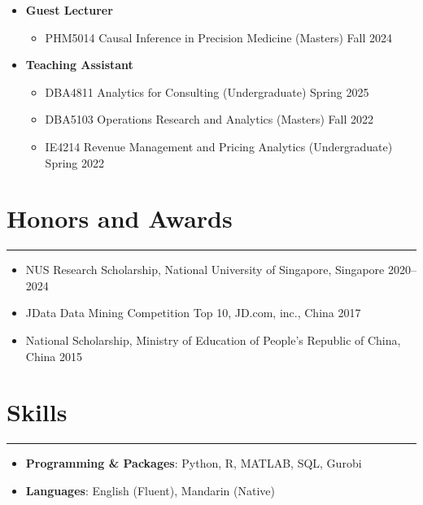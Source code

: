 \documentclass[12pt, a4paper]{article}
\begin{document}
{\begin{itemize}[leftmargin=16pt]
	\item[] \textbf{Guest Lecturer}
	\begin{itemize}[label=$\bullet$]
		\item PHM5014 Causal Inference in Precision Medicine (Masters) \hfill Fall 2024
	\end{itemize}

	\item[] \textbf{Teaching Assistant}
	\begin{itemize}[label=$\bullet$]
		\item DBA4811 Analytics for Consulting (Undergraduate) \hfill Spring 2025
		\item DBA5103 Operations Research and Analytics (Masters) \hfill Fall 2022
		\item IE4214 Revenue Management and Pricing Analytics (Undergraduate) \hfill Spring 2022
	\end{itemize}
\end{itemize}




\section*{Honors and Awards}
\vspace*{4pt}
\hrule

\begin{itemize}[leftmargin=30pt, parsep=0.5pt]
	\item NUS Research Scholarship, National University of Singapore, Singapore \hfill 2020--2024
	\item JData Data Mining Competition Top 10, JD.com, inc., China \hfill 2017
	\item National Scholarship, Ministry of Education of People's Republic of China, China \hfill 2015
\end{itemize}




\section*{Skills}
\vspace*{4pt}
\hrule

\begin{itemize}[leftmargin=16pt]
	\item[] \textbf{Programming \& Packages}: Python, R, MATLAB, SQL, Gurobi
	\item[] \textbf{Languages}: English (Fluent), Mandarin (Native)
\end{itemize}


}

\end{document}
